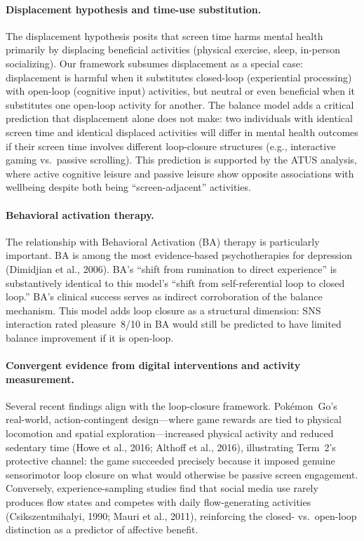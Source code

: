 \documentclass[a4paper,11pt,titlepage]{article}
\begin{document}
\paragraph{Displacement hypothesis and time-use substitution.}
The displacement hypothesis posits that screen time harms mental health primarily by displacing beneficial activities (physical exercise, sleep, in-person socializing). Our framework subsumes displacement as a special case: displacement is harmful when it substitutes closed-loop (experiential processing) with open-loop (cognitive input) activities, but neutral or even beneficial when it substitutes one open-loop activity for another. The balance model adds a critical prediction that displacement alone does not make: two individuals with identical screen time and identical displaced activities will differ in mental health outcomes if their screen time involves different loop-closure structures (e.g., interactive gaming vs.\ passive scrolling). This prediction is supported by the ATUS analysis, where active cognitive leisure and passive leisure show opposite associations with wellbeing despite both being ``screen-adjacent'' activities.

\paragraph{Behavioral activation therapy.}
The relationship with Behavioral Activation (BA) therapy is particularly important. BA is among the most evidence-based psychotherapies for depression (Dimidjian et al., 2006). BA's ``shift from rumination to direct experience'' is substantively identical to this model's ``shift from self-referential loop to closed loop.'' BA's clinical success serves as indirect corroboration of the balance mechanism. This model adds loop closure as a structural dimension: SNS interaction rated pleasure~8/10 in BA would still be predicted to have limited balance improvement if it is open-loop.

\paragraph{Convergent evidence from digital interventions and activity measurement.}
Several recent findings align with the loop-closure framework. Pok\'emon~Go's real-world, action-contingent design---where game rewards are tied to physical locomotion and spatial exploration---increased physical activity and reduced sedentary time (Howe et al., 2016; Althoff et al., 2016), illustrating Term~2's protective channel: the game succeeded precisely because it imposed genuine sensorimotor loop closure on what would otherwise be passive screen engagement. Conversely, experience-sampling studies find that social media use rarely produces flow states and competes with daily flow-generating activities (Csikszentmihalyi, 1990; Mauri et al., 2011), reinforcing the closed- vs.\ open-loop distinction as a predictor of affective benefit.
\end{document}
